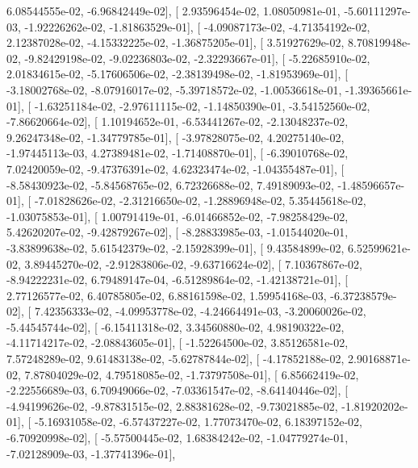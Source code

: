\documentclass{article}
\begin{document}
          6.08544555e-02,  -6.96842449e-02],
       [  2.93596454e-02,   1.08050981e-01,  -5.60111297e-03,
         -1.92226262e-02,  -1.81863529e-01],
       [ -4.09087173e-02,  -4.71354192e-02,   2.12387028e-02,
         -4.15332225e-02,  -1.36875205e-01],
       [  3.51927629e-02,   8.70819948e-02,  -9.82429198e-02,
         -9.02236803e-02,  -2.32293667e-01],
       [ -5.22685910e-02,   2.01834615e-02,  -5.17606506e-02,
         -2.38139498e-02,  -1.81953969e-01],
       [ -3.18002768e-02,  -8.07916017e-02,  -5.39718572e-02,
         -1.00536618e-01,  -1.39365661e-01],
       [ -1.63251184e-02,  -2.97611115e-02,  -1.14850390e-01,
         -3.54152560e-02,  -7.86620664e-02],
       [  1.10194652e-01,  -6.53441267e-02,  -2.13048237e-02,
          9.26247348e-02,  -1.34779785e-01],
       [ -3.97828075e-02,   4.20275140e-02,  -1.97445113e-03,
          4.27389481e-02,  -1.71408870e-01],
       [ -6.39010768e-02,   7.02420059e-02,  -9.47376391e-02,
          4.62323474e-02,  -1.04355487e-01],
       [ -8.58430923e-02,  -5.84568765e-02,   6.72326688e-02,
          7.49189093e-02,  -1.48596657e-01],
       [ -7.01828626e-02,  -2.31216650e-02,  -1.28896948e-02,
          5.35445618e-02,  -1.03075853e-01],
       [  1.00791419e-01,  -6.01466852e-02,  -7.98258429e-02,
          5.42620207e-02,  -9.42879267e-02],
       [ -8.28833985e-03,  -1.01544020e-01,  -3.83899638e-02,
          5.61542379e-02,  -2.15928399e-01],
       [  9.43584899e-02,   6.52599621e-02,   3.89445270e-02,
         -2.91283806e-02,  -9.63716624e-02],
       [  7.10367867e-02,  -8.94222231e-02,   6.79489147e-04,
         -6.51289864e-02,  -1.42138721e-01],
       [  2.77126577e-02,   6.40785805e-02,   6.88161598e-02,
          1.59954168e-03,  -6.37238579e-02],
       [  7.42356333e-02,  -4.09953778e-02,  -4.24664491e-03,
         -3.20060026e-02,  -5.44545744e-02],
       [ -6.15411318e-02,   3.34560880e-02,   4.98190322e-02,
         -4.11714217e-02,  -2.08843605e-01],
       [ -1.52264500e-02,   3.85126581e-02,   7.57248289e-02,
          9.61483138e-02,  -5.62787844e-02],
       [ -4.17852188e-02,   2.90168871e-02,   7.87804029e-02,
          4.79518085e-02,  -1.73797508e-01],
       [  6.85662419e-02,  -2.22556689e-03,   6.70949066e-02,
         -7.03361547e-02,  -8.64140446e-02],
       [ -4.94199626e-02,  -9.87831515e-02,   2.88381628e-02,
         -9.73021885e-02,  -1.81920202e-01],
       [ -5.16931058e-02,  -6.57437227e-02,   1.77073470e-02,
          6.18397152e-02,  -6.70920998e-02],
       [ -5.57500445e-02,   1.68384242e-02,  -1.04779274e-01,
         -7.02128909e-03,  -1.37741396e-01],
\end{document}
